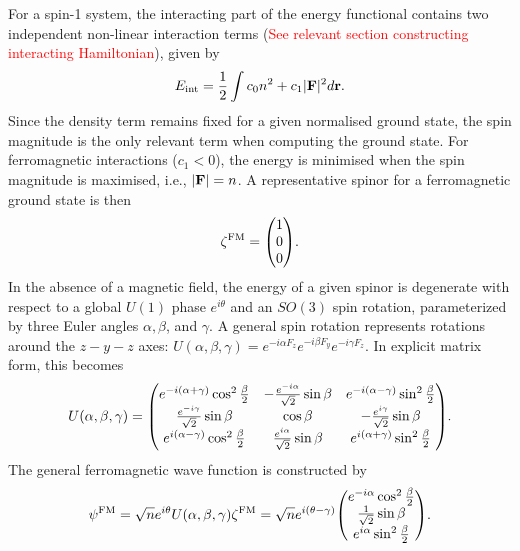 For a spin-1 system, the interacting part of the energy functional contains
two independent non-linear interaction terms (\textcolor{red}{See relevant
section constructing interacting Hamiltonian}), given by
\begin{equation}
    E_\mathrm{int} = \frac{1}{2}\int c_0n^2+c_1|\vb{F}|^2 d\vb{r}.
\end{equation}
Since the density term remains fixed for a given normalised ground state, the
spin magnitude is the only relevant term when computing the ground state.
For ferromagnetic interactions (\(c_1 < 0 \)), the energy is minimised when
the spin magnitude is maximised, i.e., \(|\vb{F}| = n\).
A representative spinor for a ferromagnetic ground state is then
\begin{equation}
    \zeta^\mathrm{FM} = \mqty(1 \\ 0 \\ 0).
\end{equation}
In the absence of a magnetic field, the energy of a given spinor is degenerate
with respect to a global \(U(1)\) phase \(e^{i\theta}\) and an \(SO(3)\) spin
rotation, parameterized by three Euler angles \(\alpha, \beta \),
and \(\gamma \).
A general spin rotation represents rotations around the \(z-y-z\) axes:
\(U(\alpha, \beta, \gamma) = e^{-i\alpha F_z}e^{-i\beta F_y}e^{-i\gamma F_z}\).
In explicit matrix form, this becomes
\begin{equation}
    U(\alpha, \beta, \gamma) = \mqty(
        e^{-i(\alpha + \gamma)}\cos^2\frac{\beta}{2} &
        -\frac{e^{-i\alpha}}{\sqrt{2}}\sin\beta &
        e^{-i(\alpha - \gamma)}\sin^2\frac{\beta}{2} \\
        \frac{e^{-i\gamma}}{\sqrt{2}}\sin\beta &
        \cos\beta &
        -\frac{e^{i\gamma}}{\sqrt{2}}\sin\beta \\
        e^{i(\alpha - \gamma)}\cos^2\frac{\beta}{2} &
        \frac{e^{i\alpha}}{\sqrt{2}}\sin\beta &
        e^{i(\alpha + \gamma)}\sin^2\frac{\beta}{2}
    ).
\end{equation}
The general ferromagnetic wave function is constructed by
\begin{equation}
    \psi^\mathrm{FM} = 
    \sqrt{n}e^{i\theta}U(\alpha, \beta, \gamma)\zeta^\mathrm{FM} = 
    \sqrt{n}e^{i(\theta - \gamma)}\mqty(
        e^{-i\alpha}\cos^2\frac{\beta}{2} \\
        \frac{1}{\sqrt{2}}\sin\beta \\
        e^{i\alpha}\sin^2\frac{\beta}{2}
        ).
\end{equation}

